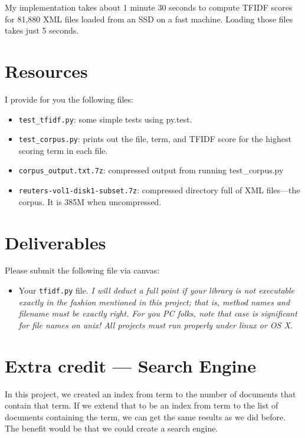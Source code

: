 \begin{fullwidth}
My implementation takes about 1 minute 30 seconds to compute TFIDF scores for 81,880 XML files loaded from an SSD on a fast machine.  Loading those files takes just 5 seconds.
 
\section{Resources}

I provide for you the following files:

\begin{itemize}
\item {\tt test\_tfidf.py}: some simple tests using py.test.
\item {\tt test\_corpus.py}: prints out the file, term, and TFIDF score for the highest scoring term in each file.
\item {\tt corpus\_output.txt.7z}: compressed output from running test\_corpus.py
\item {\tt reuters-vol1-disk1-subset.7z}: compressed directory full of XML files---the corpus. It is 385M when uncompressed.
\end{itemize}

\section{Deliverables}

\noindent Please submit the following file via canvas:

\begin{itemize}
\item Your {\tt tfidf.py} file. {\em I will deduct a full point if your library is not executable exactly in the fashion mentioned in this project; that is, method names and filename must be exactly right. For you PC folks, note that case is significant for file names on unix! All projects must run properly under linux or OS X.}
\end{itemize}

\section{Extra credit --- Search Engine}

In this project, we created an index from term to the number of documents that contain that term. If we extend that to be an index from term to the list of documents containing the term, we can get the same results as we did before. The benefit would be that we could create a search engine.


\end{fullwidth}
